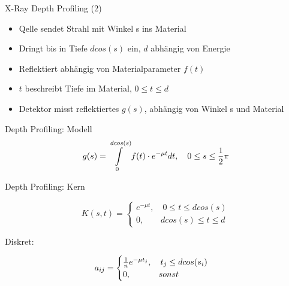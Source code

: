 \documentclass[11pt]{beamer}
\begin{document}
\begin{frame}{X-Ray Depth Profiling (2)}
\begin{itemize}
\item Qelle sendet Strahl mit Winkel s ins Material\\
\item Dringt bis in Tiefe $d cos(s)$ ein, $d$ abhängig von Energie\\
\item Reflektiert abhängig von Materialparameter $f(t)$\\
\item $t$ beschreibt Tiefe im Material, $0 \leq t \leq d$\\
\item Detektor misst reflektiertes $g(s)$, abhängig von Winkel s und Material
\end{itemize}
\end{frame}

\begin{frame}{Depth Profiling: Modell}
\[
g(s) = \int\limits_{0}^{d cos(s)} f(t) \cdot e^{-\mu t} dt, \, \, \, \, \, \, 0 \leq s \leq {1\over 2} \pi
\]
\end{frame}

\begin{frame}{Depth Profiling: Kern}

\[
K(s,t) = 
\begin{cases}
e^{-\mu t}, \, \, \, \, \, \, 0 \leq t \leq d cos(s)\\
0, \, \, \, \, \, \, \, \, \, \, \, \,  d cos(s) \leq t \leq d
\end{cases}
\]

Diskret:

\[
a_{ij} = 
\begin{cases}
{1 \over n} e^{-\mu t_j}, \, \, \, \, \, \, t_j \leq d cos(s_i)\\
0, \, \, \, \, \, \, \, \, \, \, \, \, \, \, \, \, \, \, \, \, sonst
\end{cases}
\]


\end{frame}
\end{document}
